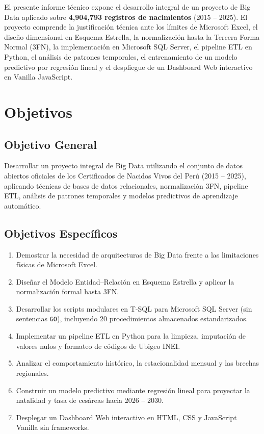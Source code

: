 \documentclass[12pt,a4paper]{article}
\begin{document}
El presente informe técnico expone el desarrollo integral de un proyecto de Big Data aplicado sobre \textbf{4,904,793 registros de nacimientos} (2015 -- 2025). El proyecto comprende la justificación técnica ante los límites de Microsoft Excel, el diseño dimensional en Esquema Estrella, la normalización hasta la Tercera Forma Normal (3FN), la implementación en Microsoft SQL Server, el pipeline ETL en Python, el análisis de patrones temporales, el entrenamiento de un modelo predictivo por regresión lineal y el despliegue de un Dashboard Web interactivo en Vanilla JavaScript.

\section{Objetivos}

\subsection{Objetivo General}
Desarrollar un proyecto integral de Big Data utilizando el conjunto de datos abiertos oficiales de los Certificados de Nacidos Vivos del Perú (2015 -- 2025), aplicando técnicas de bases de datos relacionales, normalización 3FN, pipeline ETL, análisis de patrones temporales y modelos predictivos de aprendizaje automático.

\subsection{Objetivos Específicos}
\begin{enumerate}
    \item Demostrar la necesidad de arquitecturas de Big Data frente a las limitaciones físicas de Microsoft Excel.
    \item Diseñar el Modelo Entidad--Relación en Esquema Estrella y aplicar la normalización formal hasta 3FN.
    \item Desarrollar los scripts modulares en T-SQL para Microsoft SQL Server (sin sentencias \texttt{GO}), incluyendo 20 procedimientos almacenados estandarizados.
    \item Implementar un pipeline ETL en Python para la limpieza, imputación de valores nulos y formateo de códigos de Ubigeo INEI.
    \item Analizar el comportamiento histórico, la estacionalidad mensual y las brechas regionales.
    \item Construir un modelo predictivo mediante regresión lineal para proyectar la natalidad y tasa de cesáreas hacia 2026 -- 2030.
    \item Desplegar un Dashboard Web interactivo en HTML, CSS y JavaScript Vanilla sin frameworks.
\end{enumerate}
\end{document}
